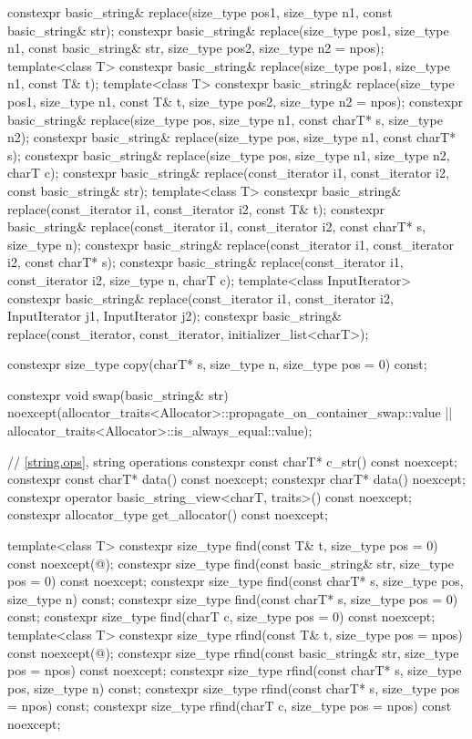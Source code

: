 \begin{codeblock}
{{    constexpr basic_string& replace(size_type pos1, size_type n1, const basic_string& str);
    constexpr basic_string& replace(size_type pos1, size_type n1, const basic_string& str,
                                    size_type pos2, size_type n2 = npos);
    template<class T>
      constexpr basic_string& replace(size_type pos1, size_type n1, const T& t);
    template<class T>
      constexpr basic_string& replace(size_type pos1, size_type n1, const T& t,
                                      size_type pos2, size_type n2 = npos);
    constexpr basic_string& replace(size_type pos, size_type n1, const charT* s, size_type n2);
    constexpr basic_string& replace(size_type pos, size_type n1, const charT* s);
    constexpr basic_string& replace(size_type pos, size_type n1, size_type n2, charT c);
    constexpr basic_string& replace(const_iterator i1, const_iterator i2,
                                    const basic_string& str);
    template<class T>
      constexpr basic_string& replace(const_iterator i1, const_iterator i2, const T& t);
    constexpr basic_string& replace(const_iterator i1, const_iterator i2, const charT* s,
                                    size_type n);
    constexpr basic_string& replace(const_iterator i1, const_iterator i2, const charT* s);
    constexpr basic_string& replace(const_iterator i1, const_iterator i2, size_type n, charT c);
    template<class InputIterator>
      constexpr basic_string& replace(const_iterator i1, const_iterator i2,
                                      InputIterator j1, InputIterator j2);
    constexpr basic_string& replace(const_iterator, const_iterator, initializer_list<charT>);

    constexpr size_type copy(charT* s, size_type n, size_type pos = 0) const;

    constexpr void swap(basic_string& str)
      noexcept(allocator_traits<Allocator>::propagate_on_container_swap::value ||
               allocator_traits<Allocator>::is_always_equal::value);

    // \ref{string.ops}, string operations
    constexpr const charT* c_str() const noexcept;
    constexpr const charT* data() const noexcept;
    constexpr charT* data() noexcept;
    constexpr operator basic_string_view<charT, traits>() const noexcept;
    constexpr allocator_type get_allocator() const noexcept;

    template<class T>
      constexpr size_type find(const T& t, size_type pos = 0) const noexcept(@\seebelow@);
    constexpr size_type find(const basic_string& str, size_type pos = 0) const noexcept;
    constexpr size_type find(const charT* s, size_type pos, size_type n) const;
    constexpr size_type find(const charT* s, size_type pos = 0) const;
    constexpr size_type find(charT c, size_type pos = 0) const noexcept;
    template<class T>
      constexpr size_type rfind(const T& t, size_type pos = npos) const noexcept(@\seebelow@);
    constexpr size_type rfind(const basic_string& str, size_type pos = npos) const noexcept;
    constexpr size_type rfind(const charT* s, size_type pos, size_type n) const;
    constexpr size_type rfind(const charT* s, size_type pos = npos) const;
    constexpr size_type rfind(charT c, size_type pos = npos) const noexcept;

}}
\end{codeblock}
